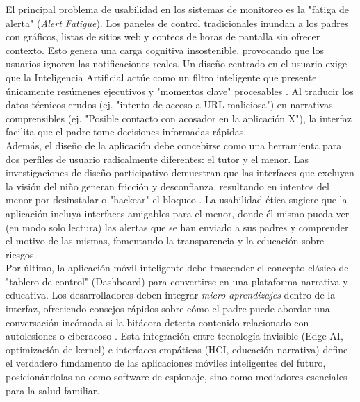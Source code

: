 El principal problema de usabilidad en los sistemas de monitoreo es la "fatiga de alerta" (\textit{Alert Fatigue}). Los paneles de control tradicionales inundan a los padres con gráficos, listas de sitios web y conteos de horas de pantalla sin ofrecer contexto. Esto genera una carga cognitiva insostenible, provocando que los usuarios ignoren las notificaciones reales. Un diseño centrado en el usuario exige que la Inteligencia Artificial actúe como un filtro inteligente que presente únicamente resúmenes ejecutivos y "momentos clave" procesables \cite{gnanasekaran_usability_2023}. Al traducir los datos técnicos crudos (ej. "intento de acceso a URL maliciosa") en narrativas comprensibles (ej. "Posible contacto con acosador en la aplicación X"), la interfaz facilita que el padre tome decisiones informadas rápidas.\\

Además, el diseño de la aplicación debe concebirse como una herramienta para dos perfiles de usuario radicalmente diferentes: el tutor y el menor. Las investigaciones de diseño participativo demuestran que las interfaces que excluyen la visión del niño generan fricción y desconfianza, resultando en intentos del menor por desinstalar o "hackear" el bloqueo \cite{mcnally_co-designing_2018}. La usabilidad ética sugiere que la aplicación incluya interfaces amigables para el menor, donde él mismo pueda ver (en modo solo lectura) las alertas que se han enviado a sus padres y comprender el motivo de las mismas, fomentando la transparencia y la educación sobre riesgos.\\

Por último, la aplicación móvil inteligente debe trascender el concepto clásico de "tablero de control" (Dashboard) para convertirse en una plataforma narrativa y educativa. Los desarrolladores deben integrar \textit{micro-aprendizajes} dentro de la interfaz, ofreciendo consejos rápidos sobre cómo el padre puede abordar una conversación incómoda si la bitácora detecta contenido relacionado con autolesiones o ciberacoso \cite{ayyash_cybersecurity_2024, stoilova_parental_2024}. Esta integración entre tecnología invisible (Edge AI, optimización de kernel) e interfaces empáticas (HCI, educación narrativa) define el verdadero fundamento de las aplicaciones móviles inteligentes del futuro, posicionándolas no como software de espionaje, sino como mediadores esenciales para la salud familiar.\\